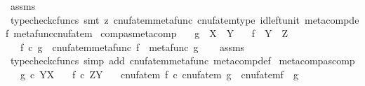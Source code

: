 \begin{isabellebody}
\isamarkupfalse%
\ assms\ \isamarkupfalse%
\ {\isacharparenleft}{\kern0pt}typecheck{\isacharunderscore}{\kern0pt}cfuncs{\isacharcomma}{\kern0pt}\ smt\ {\isacharparenleft}{\kern0pt}z{}{\isacharparenright}{\kern0pt}\ cnufatem{\isacharunderscore}{\kern0pt}metafunc\ cnufatem{\isacharunderscore}{\kern0pt}type\ id{\isacharunderscore}{\kern0pt}left{\isacharunderscore}{\kern0pt}unit{}\ meta{\isacharunderscore}{\kern0pt}comp{}{\isacharunderscore}{\kern0pt}def{}\ metafunc{\isacharunderscore}{\kern0pt}cnufatem{\isacharparenright}{\kern0pt}%
\endisatagproof
{\isafoldproof}%
%
\isadelimproof
\isanewline
%
\endisadelimproof
\isanewline
{}\isamarkupfalse%
\ comp{\isacharunderscore}{\kern0pt}as{\isacharunderscore}{\kern0pt}metacomp{\isacharcolon}{\kern0pt}\isanewline
\ \ \ {\isachardoublequoteopen}g\ {\isacharcolon}{\kern0pt}\ X\ {\isasymrightarrow}\ Y{\isachardoublequoteclose}\isanewline
\ \ \ {\isachardoublequoteopen}f\ {\isacharcolon}{\kern0pt}\ Y\ {\isasymrightarrow}\ Z{\isachardoublequoteclose}\isanewline
\ \ \ {\isachardoublequoteopen}f\ {\isasymcirc}\isactrlsub c\ g\ {\isacharequal}{\kern0pt}\ cnufatem{\isacharparenleft}{\kern0pt}metafunc\ f\ {\isasymbox}\ metafunc\ g{\isacharparenright}{\kern0pt}{\isachardoublequoteclose}\isanewline
%
\isadelimproof
\ \ %
\endisadelimproof
%
\isatagproof
{}\isamarkupfalse%
\ assms\ \isamarkupfalse%
\ {\isacharparenleft}{\kern0pt}typecheck{\isacharunderscore}{\kern0pt}cfuncs{\isacharcomma}{\kern0pt}\ simp\ add{\isacharcolon}{\kern0pt}\ cnufatem{\isacharunderscore}{\kern0pt}metafunc\ meta{\isacharunderscore}{\kern0pt}comp{}{\isacharunderscore}{\kern0pt}def{}{\isacharparenright}{\kern0pt}%
\endisatagproof
{\isafoldproof}%
%
\isadelimproof
\isanewline
%
\endisadelimproof
\isanewline
{}\isamarkupfalse%
\ metacomp{\isacharunderscore}{\kern0pt}as{\isacharunderscore}{\kern0pt}comp{\isacharcolon}{\kern0pt}\isanewline
\ \ \ {\isachardoublequoteopen}g\ {\isasymin}\isactrlsub c\ Y\isactrlbsup X\isactrlesup {\isachardoublequoteclose}\isanewline
\ \ \ {\isachardoublequoteopen}f\ {\isasymin}\isactrlsub c\ Z\isactrlbsup Y\isactrlesup {\isachardoublequoteclose}\isanewline
\ \ \ {\isachardoublequoteopen}cnufatem\ f\ {\isasymcirc}\isactrlsub c\ cnufatem\ g\ {\isacharequal}{\kern0pt}\ cnufatem{\isacharparenleft}{\kern0pt}f\ {\isasymbox}\ g{\isacharparenright}{\kern0pt}{\isachardoublequoteclose}\isanewline

\end{isabellebody}
